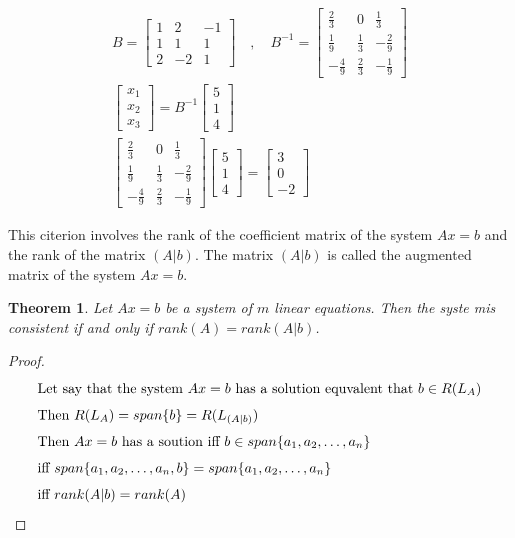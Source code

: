 \documentclass[10pt, oneside]{article}
\newtheorem{thm}{Theorem}
\begin{document}
\[
	\begin{split}
		B = \begin{bmatrix} 1 & 2 & -1 \\ 1 & 1 & 1 \\ 2 & -2 & 1 \end{bmatrix} \quad , \quad B^{-1} = \begin{bmatrix}
			\frac{2}{3}  & 0           & \frac{1}{3}  \\
			\frac{1}{9}  & \frac{1}{3} & -\frac{2}{9} \\
			-\frac{4}{9} & \frac{2}{3} & -\frac{1}{9}
		\end{bmatrix} \\
		\begin{bmatrix} x_1 \\ x_2 \\ x_3 \end{bmatrix} = B^{-1} \begin{bmatrix} 5 \\ 1 \\ 4 \end{bmatrix} \\
		\begin{bmatrix} \frac{2}{3}  & 0           & \frac{1}{3}  \\
                \frac{1}{9}  & \frac{1}{3} & -\frac{2}{9} \\
                -\frac{4}{9} & \frac{2}{3} & -\frac{1}{9}\end{bmatrix} \begin{bmatrix} 5 \\ 1 \\ 4 \end{bmatrix} = \begin{bmatrix} 3 \\ 0 \\ -2 \end{bmatrix}
	\end{split}
\]

This citerion involves the rank of the coefficient matrix of the system $Ax = b$ and the rank of the matrix $(A|b)$. The matrix $(A|b)$ is called the augmented matrix of the system $Ax = b$.

\begin{thm}
	Let $Ax = b$ be a system of $m$ linear equations. Then the syste mis consistent if and only if $rank(A) = rank(A|b)$.
\end{thm}

\begin{proof}
	\begin{align*}
		\intertext{Let say that the system $Ax = b$ has a solution equvalent that $b \in R(L_A)$}
		\intertext{Then $R(L_A) = span\{b\} = R(L_{(A|b)})$}
		\intertext{Then $Ax = b$ has a soution iff $b \in span\{a_1, a_2, \ldots, a_n\}$}
		\intertext{iff $span\{a_1, a_2, \ldots, a_n, b\} = span\{a_1, a_2, \ldots, a_n\}$}
		\intertext{iff $rank(A|b) = rank(A)$}
	\end{align*}
\end{proof}
\end{document}

